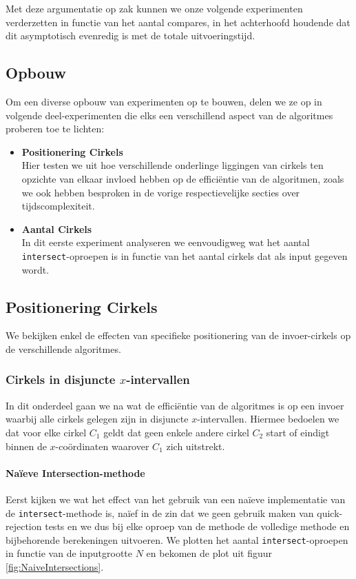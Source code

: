 \documentclass[12pt]{article}
\begin{document}
Met deze argumentatie op zak kunnen we onze volgende experimenten verderzetten in functie van het aantal compares, in het achterhoofd houdende dat dit asymptotisch evenredig is met de totale uitvoeringstijd.

\subsection{Opbouw}
Om een diverse opbouw van experimenten op te bouwen, delen we ze op in volgende deel-experimenten die elks een verschillend aspect van de algoritmes proberen toe te lichten:
\begin{itemize}
	\item \textbf{Positionering Cirkels}\\
	Hier testen we uit hoe verschillende onderlinge liggingen van cirkels ten opzichte van elkaar invloed hebben op de efficiëntie van de algoritmen, zoals we ook hebben besproken in de vorige respectievelijke secties over tijdscomplexiteit.
	\item \textbf{Aantal Cirkels}\\
		In dit eerste experiment analyseren we eenvoudigweg wat het aantal \texttt{intersect}-oproepen is in functie van het aantal cirkels dat als input gegeven wordt. 
\end{itemize}


\subsection{Positionering Cirkels}
We bekijken enkel de effecten van specifieke positionering van de invoer-cirkels op de verschillende algoritmes.

\subsubsection{Cirkels in disjuncte $x$-intervallen}
In dit onderdeel gaan we na wat de efficiëntie van de algoritmes is op een invoer waarbij alle cirkels gelegen zijn in disjuncte $x$-intervallen. Hiermee bedoelen we dat voor elke cirkel $C_1$ geldt dat geen enkele andere cirkel $C_2$ start of eindigt binnen de $x$-coördinaten waarover $C_1$ zich uitstrekt.

\paragraph{Naïeve Intersection-methode}
Eerst kijken we wat het effect van het gebruik van een naïeve implementatie van de \texttt{intersect}-methode is, naïef in de zin dat we geen gebruik maken van quick-rejection tests en we dus bij elke oproep van de methode de volledige methode en bijbehorende berekeningen uitvoeren. We plotten het aantal \texttt{intersect}-oproepen in functie van de inputgrootte $N$ en bekomen de plot uit figuur \ref{fig:NaiveIntersections}.
\end{document}
